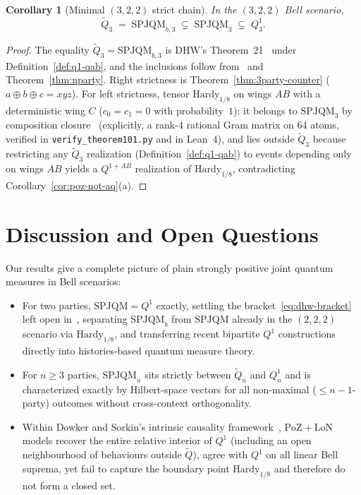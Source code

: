 \documentclass[11pt,a4paper]{article}
\newtheorem{corollary}[theorem]{Corollary}
\theoremstyle{definition}
\theoremstyle{remark}
\newcommand{\SPJQM}{\mathrm{SPJQM}}
\newcommand{\SPJQMb}{\mathrm{SPJQM}_b}
\newcommand{\Qone}{Q^{1}}
\newcommand{\QAB}{Q^{1+AB}}
\newcommand{\tQ}{\widetilde{Q}}
\newcommand{\PoZ}{\mathrm{PoZ}}
\newcommand{\LoN}{\mathrm{LoN}}
\begin{document}
\begin{corollary}[Minimal $(3,2,2)$ strict chain]
\label{cor:3party-chain}
In the $(3,2,2)$ Bell scenario,
\[
\tQ_3 \;=\; \mathrm{SPJQM}_{b,3} \;\subsetneq\; \SPJQM_3 \;\subsetneq\; \Qone_3.
\]
\end{corollary}

\begin{proof}
The equality $\tQ_3 = \mathrm{SPJQM}_{b,3}$ is DHW's Theorem~21~\cite[L1138]{DHW2014} under Definition~\ref{def:q1-qab}, and the inclusions follow from~\cite{DHW2014} and Theorem~\ref{thm:nparty}. Right strictness is Theorem~\ref{thm:3party-counter} ($a\oplus b\oplus c = xyz$). For left strictness, tensor $\mathrm{Hardy}_{1/8}$ on wings $AB$ with a deterministic wing $C$ ($c_0 = c_1 = 0$ with probability~$1$): it belongs to $\SPJQM_3$ by composition closure~\cite[Lem.~6]{DHW2014} (explicitly, a rank-$4$ rational Gram matrix on $64$ atoms, verified in \texttt{verify\_theorem101.py} and in Lean~4), and lies outside $\tQ_3$ because restricting any $\tQ_3$ realization (Definition~\ref{def:q1-qab}) to events depending only on wings $AB$ yields a $\QAB$ realization of $\mathrm{Hardy}_{1/8}$, contradicting Corollary~\ref{cor:poz-not-aq}(a).
\end{proof}

\section{Discussion and Open Questions}
\label{sec:discussion}

Our results give a complete picture of plain strongly positive joint quantum measures in Bell scenarios:
\begin{itemize}[leftmargin=*,nosep]
\item For two parties, $\SPJQM = \Qone$ exactly, settling the bracket~\eqref{eq:dhw-bracket} left open in~\cite{DHW2014}, separating $\SPJQMb$ from $\SPJQM$ already in the $(2,2,2)$ scenario via $\mathrm{Hardy}_{1/8}$, and transferring recent bipartite $\Qone$ constructions~\cite{Gazi2026,DasBhowmikBanik2026} directly into histories-based quantum measure theory.
\item For $n \ge 3$ parties, $\SPJQM_n$ sits strictly between $\tQ_n$ and $\Qone_n$ and is characterized exactly by Hilbert-space vectors for all non-maximal ($\le n-1$-party) outcomes without cross-context orthogonality.
\item Within Dowker and Sorkin's intrinsic causality framework~\cite{DowkerSorkin2023}, $\PoZ+\LoN$ models recover the entire relative interior of $\Qone$ (including an open neighbourhood of behaviours outside $\tQ$), agree with $\Qone$ on all linear Bell suprema, yet fail to capture the boundary point $\mathrm{Hardy}_{1/8}$ and therefore do not form a closed set.
\end{itemize}
\end{document}

